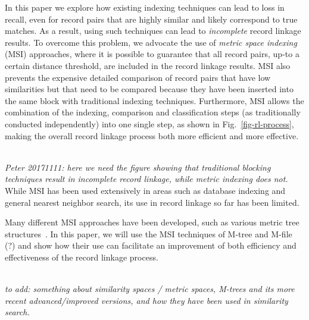 \documentclass{llncs}
\begin{document}
In this paper we explore how existing indexing techniques can lead to
loss in recall, even for record pairs that are highly similar and
likely correspond to true matches. As a result, using such techniques
can lead to \emph{incomplete} record linkage results. To overcome this
problem, we advocate the use of \emph{metric space indexing} (MSI)
approaches, where it is possible to guarantee that all record pairs,
up-to a certain distance threshold, are included in the record linkage
results. MSI also prevents the expensive detailed comparison of record
pairs that have low similarities but that need to be compared because
they have been inserted into the same block with traditional indexing
techniques. Furthermore, MSI allows the combination of the indexing,
comparison and classification steps (as traditionally conducted
independently) into one single step, as shown in
Fig.~\ref{fig-rl-process}, making the overall record linkage process
both more efficient and more effective.



~ \\
\emph{Peter 20171111: here we need the figure showing that traditional
blocking techniques result in incomplete record linkage, while metric
indexing does not.}
~ \\

While MSI has been used extensively in areas such as database indexing
and general nearest neighbor search, its use in record linkage so far
has been limited. 

Many different MSI approaches have been developed, such as various
metric tree structures~\cite{}. 
In this paper, we will use the MSI techniques of M-tree and M-file (?)
and show how their use can facilitate an improvement of both
efficiency and effectiveness of the record linkage process.

~ \\
\emph{
to add: something about similarity spaces / metric spaces, M-trees and its
more recent advanced/improved versions, and how they have been used in
similarity search.}
\end{document}
